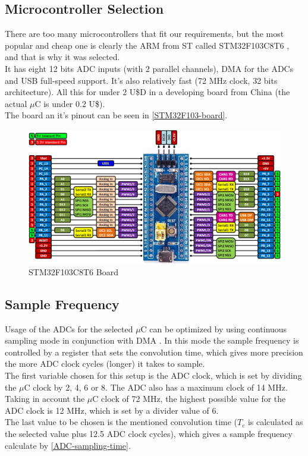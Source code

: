 \subsection{Microcontroller Selection}
There are too many microcontrollers that fit our requirements, but the most popular
and cheap one is clearly the ARM from ST called STM32F103C8T6 \cite{STM32F103},
and that is why it was selected. \\
It has eight 12 bits ADC inputs (with 2 parallel channels), DMA for the ADCs and USB full-speed support. It's
also relatively fast (72 MHz clock, 32 bits architecture). All this for under 2 U\$D
in a developing board from China (the actual $\mu$C is under 0.2 U\$). \\
The board an it's pinout can be seen in \autoref{STM32F103-board}.

\begin{figure}[htb]
  \centering
  \caption{STM32F103C8T6 Board}
  \label{STM32F103-board}
  \includegraphics[scale=0.3]{images/STM32F103-board}
\end{figure}

\subsection{Sample Frequency}
\label{firmware-sample-frequency}
Usage of the ADCs for the selected $\mu$C can be optimized by using continuous sampling
mode in conjunction with DMA \cite[ch. 11]{STM32F103}. In this mode the sample frequency is controlled by a register
that sets the convolution time, which gives more precision the more ADC clock
cycles (longer) it takes to sample.\\
The first variable chosen for this setup is the ADC clock, which is set by dividing
the $\mu$C clock by 2, 4, 6 or 8. The ADC also has a maximum clock of 14 MHz. Taking in
account the  $\mu$C clock of 72 MHz, the highest possible value for the ADC clock is 12 MHz,
which is set by a divider value of 6. \\
The last value to be chosen is the mentioned convolution time ($T_{c}$ is calculated as the selected
value plus 12.5 ADC clock cycles), which gives a sample frequency calculate by \autoref{ADC-sampling-time}.

